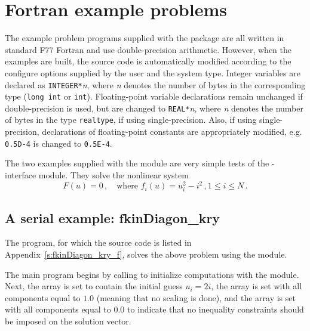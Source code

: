 \section{Fortran example problems}\label{s:ex_fortran}

The {\F} example problem programs supplied with the {\kinsol}
package are all written in standard F77 Fortran and use double-precision
arithmetic. However, when the {\F} examples are built, the source code is
automatically modified according to the configure options supplied by the
user and the system type. Integer variables are declared as {\tt INTEGER*}{\em n},
where {\em n} denotes the number of bytes in the corresponding {\C} type
({\tt long int} or {\tt int}). Floating-point variable declarations remain
unchanged if double-precision is used, but are changed to {\tt REAL*}{\em n},
where {\em n} denotes the number of bytes in the {\sundials} type {\tt realtype},
if using single-precision. Also, if using single-precision, declarations of
floating-point constants are appropriately modified, e.g. {\tt 0.5D-4} is
changed to {\tt 0.5E-4}.


The two examples supplied with the {\fkinsol} module are very simple tests 
of the {\F}-{\C} interface module. 
They solve the nonlinear system
\begin{equation*}
  F(u) = 0 \, , \quad \text{where } f_i(u) = u_i^2 - i^2 \, , 1 \le i \le N \, . 
\end{equation*}

\subsection{A serial example: fkinDiagon\_kry}\label{ss:fkinDiagon_kry}

The  program, for which the source code is listed in
Appendix~\ref{s:fkinDiagon_kry_f}, solves the above problem using the
{\nvecs} module.

The main program begins by calling  to initialize computations
with the {\nvecs} module. Next, the array  is set to contain
the initial guess $u_i = 2 i$, the array  is set with all 
components equal to $1.0$ (meaning that no scaling is done), and the array
 is set with all components equal to $0.0$ to indicate that no 
inequality constraints should be imposed on the solution vector.

